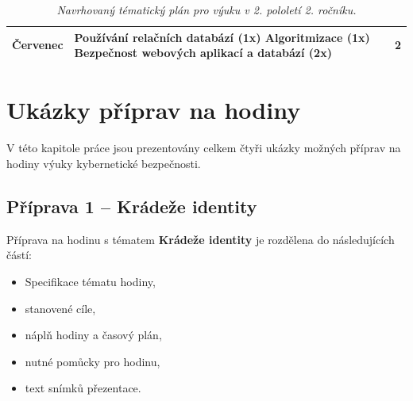 \documentclass[a4paper, 12pt]{article}
\begin{document}
\begin{table}[h!]
\begin{tabular}{| l | p{11cm} | p{2cm} |}
    Červenec &
        Používání relačních databází (1x) \newline
        Algoritmizace (1x) \newline
        Bezpečnost webových aplikací a databází (2x) &
        2 \newline 2 \newline 2
        \\ \hline
\end{tabular}
\caption{\textit{Navrhovaný tématický plán pro výuku v 2. pololetí 2. ročníku.}}
\end{table}








\newpage
\section{Ukázky příprav na hodiny}
V této kapitole práce jsou prezentovány celkem čtyři ukázky možných příprav na hodiny výuky kybernetické bezpečnosti.

\subsection{Příprava 1 -- Krádeže identity}
Příprava na hodinu s tématem \textbf{Krádeže identity} je rozdělena do následujících částí:
    \begin{itemize}
        \setlength{\itemsep}{-3pt}
        \item Specifikace tématu hodiny,
        \item stanovené cíle,
        \item náplň hodiny a časový plán,
        \item nutné pomůcky pro hodinu,
        \item text snímků přezentace.
    \end{itemize}
\end{document}
